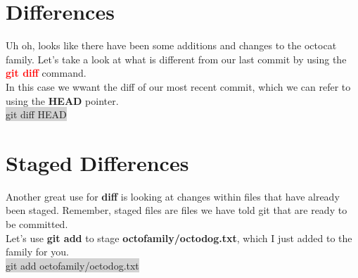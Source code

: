 \documentclass{article}
\begin{document}
\section{Differences}
\begin{minipage}[c]{0.66\textwidth}
	\parbox{\textwidth}{
		Uh oh, looks like there have been some additions and changes to the octocat family. Let's take a look at what is different from our last commit by using the \textcolor{red}{\textbf{git diff}} command.\\
		In this case we wwant the diff of our most recent commit, which we can refer to using the \textbf{HEAD} pointer.\\
		\colorbox{lightgray}{ git diff HEAD}\\
	}
\end{minipage}
\hfill
\begin{minipage}[c]{0.32\textwidth}
\end{minipage}

\section{Staged Differences}
\begin{minipage}[c]{0.66\textwidth}
	\parbox{\textwidth}{
		Another great use for \textbf{diff} is looking at changes within files that have already been staged. Remember, staged files are files we have told git that are ready to be committed.\\
		Let's use \textbf{git add} to stage \textbf{octofamily/octodog.txt}, which I just added to the family for you.\\
		\colorbox{lightgray}{ git add octofamily/octodog.txt}\\
	}
\end{minipage}
\hfill
\begin{minipage}[c]{0.32\textwidth}
\end{minipage}
\end{document}
